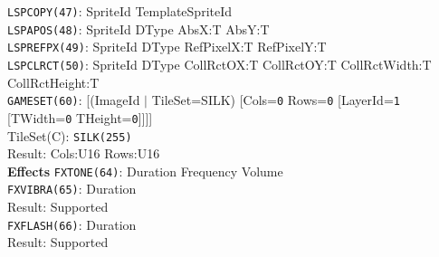 \documentclass[a4paper,twocolumn,11pt]{article}
\begin{document}
\begin{flushleft}
\vskip 4pt
{\tt LSPCOPY(47)}: SpriteId TemplateSpriteId \\
\vskip 4pt
{\tt LSPAPOS(48)}: SpriteId DType AbsX:T AbsY:T \\
\vskip 4pt
{\tt LSPREFPX(49)}: SpriteId DType RefPixelX:T RefPixelY:T \\
\vskip 4pt
{\tt LSPCLRCT(50)}: SpriteId DType CollRctOX:T CollRctOY:T CollRctWidth:T CollRctHeight:T \\
\vskip 4pt
{\tt GAMESET(60)}: [(ImageId $|$ TileSet=SILK) [Cols={\tt 0} Rows={\tt 0} [LayerId={\tt 1} [TWidth={\tt 0} THeight={\tt 0}]]]] \\
TileSet(C): {\tt SILK(255)} \\
Result: Cols:U16 Rows:U16 \\
\vskip 6pt
{\bf Effects}
\vskip 2pt
{\tt FXTONE(64)}: Duration Frequency Volume \\
\vskip 4pt
{\tt FXVIBRA(65)}: Duration \\
Result: Supported \\
\vskip 4pt
{\tt FXFLASH(66)}: Duration \\
Result: Supported \\
\vskip 4pt
\end{flushleft}
\end{document}

